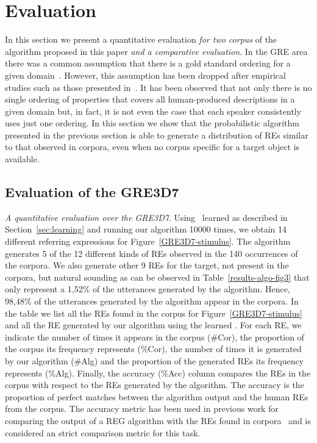\section{Evaluation}
\label{sec:evaluation}

In this section we present a quantitative evaluation \textit{for two corpus} of the algorithm proposed in this paper \textit{and a comparative evaluation}. In the GRE area there was a common assumption that there is a gold standard ordering for a given domain~\cite{Dale1995}. However, this assumption has been dropped after empirical studies such as those presented in~\cite{arec2:2008:Areces,viet:gene11}. It has been observed that not only there is no single ordering of properties that covers all human-produced descriptions in a given domain but, in fact, it is not even the case that each speaker consistently uses just one ordering. In this section we show that the probabilistic algorithm presented in the previous section is able to generate a distribution of REs similar to that observed in corpora, even when no corpus specific for a target object is available. 


\subsection{Evaluation of the GRE3D7}

\textit{A quantitative evaluation over the GRE3D7}. Using \puse~learned as described in Section~\ref{sec:learning} and running our algorithm 10000 times, we obtain 14 different referring expressions for Figure~\ref{GRE3D7-stimulus}. The algorithm generates 5 of the 12 different kinds of REs observed in the 140 occurrences of the corpora. We also generate other 9 REs for the target, not present in the corpora, but natural sounding as can be observed in Table~\ref{results-algo-fig3} that only represent a 1,52\% of the utterances generated by the algorithm. Hence, 98,48\% of the utterances generated by the algorithm appear in the corpora. In the table we list all the REs found in the corpus for Figure~\ref{GRE3D7-stimulus} and all the RE generated by our algorithm using the learned \puse. For each RE, we indicate the number of times it appears in the corpus (\#Cor), the proportion of the corpus its frequency represents (\%Cor), the number of times it is generated by our algorithm (\#Alg) and the proportion of the generated REs its frequency represents (\%Alg). Finally, the accuracy (\%Acc) column compares the REs in the corpus with respect to the REs generated by the algorithm. The accuracy is the proportion of perfect matches between the algorithm output and the human REs from the corpus. The accuracy metric has been used in previous work for comparing the output of a REG algorithm with the REs found in corpora~\cite{sluis07:eval,viet:gene11} and is considered an strict comparison metric for this task. 

